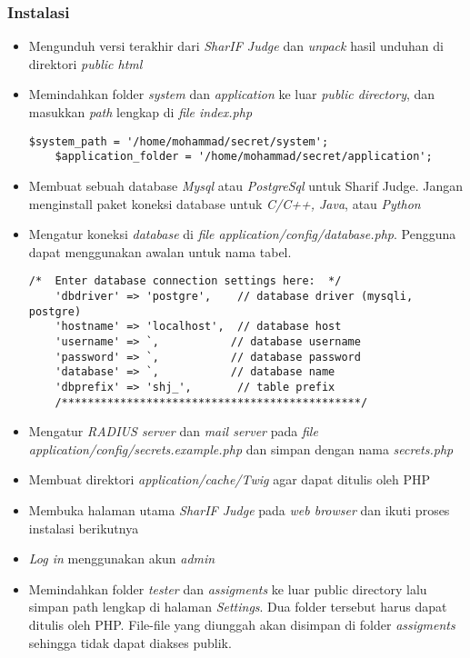 \subsubsection{Instalasi}
\label{subsubsec:instalasi}
\begin{itemize}
	\item Mengunduh versi terakhir dari \textit{SharIF Judge} dan \textit{unpack} hasil unduhan di direktori \textit{public html}
	\item Memindahkan folder \textit{system} dan \textit{application} ke luar \textit{public directory}, dan masukkan \textit{path} lengkap di \textit{file index.php}
	\begin{lstlisting}[basicstyle=\ttfamily, frame=single,
	columns=fullflexible, keepspaces=true, breaklines=true, label=ls:2]
	$system_path = '/home/mohammad/secret/system';
	$application_folder = '/home/mohammad/secret/application';
	\end{lstlisting}
	\item Membuat sebuah database \textit{Mysql} atau \textit{PostgreSql} untuk Sharif Judge. Jangan menginstall paket koneksi database untuk \textit{C/C++, Java}, atau \textit{Python}
	\item Mengatur koneksi \textit{database} di \textit{file application/config/database.php}. Pengguna dapat
	menggunakan awalan untuk nama tabel.
	\begin{lstlisting}[basicstyle=\ttfamily, frame=single,
	columns=fullflexible, keepspaces=true, breaklines=true, label=ls:3]
	/*  Enter database connection settings here:  */
	'dbdriver' => 'postgre',    // database driver (mysqli, postgre)
	'hostname' => 'localhost',  // database host
	'username' => `,           // database username
	'password' => `,           // database password
	'database' => `,           // database name
	'dbprefix' => 'shj_',       // table prefix
	/**********************************************/
	\end{lstlisting}
	\item Mengatur \textit{RADIUS server} dan \textit{mail server} pada \textit{file application/config/secrets.example.php} dan simpan dengan nama \textit{secrets.php}
	\item Membuat direktori \textit{application/cache/Twig} agar dapat ditulis oleh PHP
	\item Membuka halaman utama \textit{SharIF Judge} pada \textit{web browser} dan ikuti proses instalasi berikutnya
	\item \textit{Log in} menggunakan akun \textit{admin}
	\item Memindahkan folder \textit{tester} dan \textit{assigments} ke luar public directory lalu simpan path lengkap di halaman \textit{Settings}. Dua folder tersebut harus dapat ditulis oleh PHP. File-file yang diunggah
	akan disimpan di folder \textit{assigments} sehingga tidak dapat diakses publik.
\end{itemize}

